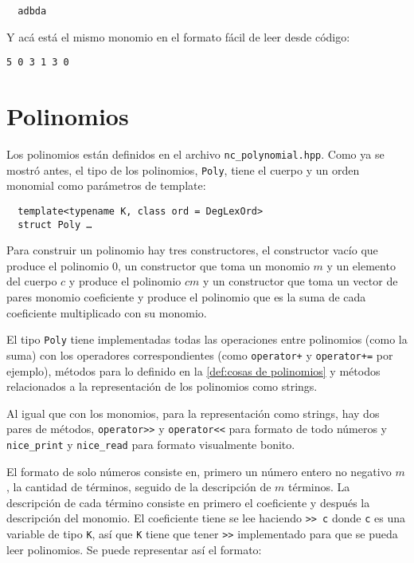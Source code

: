 \documentclass{report}
\theoremstyle{customstyle}
\theoremstyle{factstyle}
\begin{document}
\begin{lstlisting}
  adbda
\end{lstlisting}

Y acá está el mismo monomio en el formato fácil de leer desde código:

\begin{lstlisting}[escapechar=+]
  5 0 3 1 3 0
\end{lstlisting}

\section{Polinomios}

Los polinomios están definidos en el archivo \texttt{nc\_polynomial.hpp}. Como ya se mostró antes, el tipo de los polinomios, \texttt{Poly}, tiene el cuerpo y un orden monomial como parámetros de template:

\begin{verbatim}
  template<typename K, class ord = DegLexOrd>
  struct Poly …
\end{verbatim}

Para construir un polinomio hay tres constructores, el constructor vacío que produce el polinomio $0$, un constructor que toma un monomio $m$ y un elemento del cuerpo $c$ y produce el polinomio $cm$ y un constructor que toma un vector de pares monomio coeficiente y produce el polinomio que es la suma de cada coeficiente multiplicado con su monomio.

El tipo \texttt{Poly} tiene implementadas todas las operaciones entre polinomios (como la suma) con los operadores correspondientes (como \texttt{operator+} y \texttt{operator+=} por ejemplo), métodos para lo definido en la \cref{def:cosas de polinomios} y métodos relacionados a la representación de los polinomios como strings.

Al igual que con los monomios, para la representación como strings, hay dos pares de métodos, \texttt{operator>>} y \texttt{operator<<} para formato de todo números y \texttt{nice\_print} y \texttt{nice\_read} para formato visualmente bonito.

El formato de solo números consiste en, primero un número entero no negativo $m$, la cantidad de términos, seguido de la descripción de $m$ términos. La descripción de cada término consiste en primero el coeficiente y después la descripción del monomio. El coeficiente tiene se lee haciendo \texttt{>> c} donde \texttt{c} es una variable de tipo \texttt{K}, así que \texttt{K} tiene que tener \texttt{>>} implementado para que se pueda leer polinomios. Se puede representar así el formato:
\end{document}
